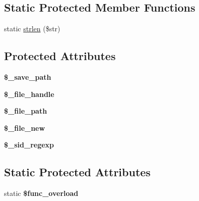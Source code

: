 \subsection*{Static Protected Member Functions}
\begin{DoxyCompactItemize}
\item 
static \mbox{\hyperlink{class_c_i___session__files__driver_afe8dce6fe07c01571d9b02da4c388ec5}{strlen}} (\$str)
\end{DoxyCompactItemize}
\subsection*{Protected Attributes}
\begin{DoxyCompactItemize}
\item 
\mbox{\label{class_c_i___session__files__driver_aa21d2ace66a94ee8883204f9a09685e5}} 
{\bfseries \$\+\_\+save\+\_\+path}
\item 
\mbox{\label{class_c_i___session__files__driver_ac71cb6166341d3d01fe8228898d9d3ec}} 
{\bfseries \$\+\_\+file\+\_\+handle}
\item 
\mbox{\label{class_c_i___session__files__driver_a60a52a8b0dc2d520c7749993842d07c7}} 
{\bfseries \$\+\_\+file\+\_\+path}
\item 
\mbox{\label{class_c_i___session__files__driver_a5b5f3b95445b6162b5f6245a3e0ccf04}} 
{\bfseries \$\+\_\+file\+\_\+new}
\item 
\mbox{\label{class_c_i___session__files__driver_accceb05a92a0c1f8def7542057314fc3}} 
{\bfseries \$\+\_\+sid\+\_\+regexp}
\end{DoxyCompactItemize}
\subsection*{Static Protected Attributes}
\begin{DoxyCompactItemize}
\item 
\mbox{\label{class_c_i___session__files__driver_adf8107ca66a5dc2273d80281d4a2588e}} 
static {\bfseries \$func\+\_\+overload}
\end{DoxyCompactItemize}
